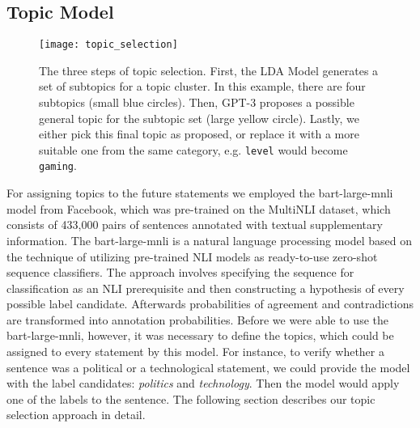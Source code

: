 \subsection{Topic Model}
\label{topic-model}
\begin{figure}[t]
    \centering
    \texttt{[image: topic\_selection]}
    \caption{
        The three steps of topic selection.
        First, the LDA Model generates a set of subtopics for a topic cluster.
        In this example, there are four subtopics (small blue circles).
        Then, GPT-3 proposes a possible general topic for the subtopic set (large yellow circle).
        Lastly, we either pick this final topic as proposed, or replace it with a more suitable one from the same category, e.g. \texttt{level} would become \texttt{gaming}.
    }
    \label{fig:topic_selection}
\end{figure}
For assigning topics to the future statements we employed the bart-large-mnli model from Facebook, which was pre-trained on the MultiNLI \citep{N18-1101} dataset, which consists of 433,000 pairs of sentences annotated with textual supplementary information. The bart-large-mnli is a natural language processing model based on the technique of \citet{yin2019benchmarking} utilizing pre-trained NLI models as ready-to-use zero-shot sequence classifiers.
The approach involves specifying the sequence for classification as an NLI prerequisite and then constructing a hypothesis of every possible label candidate.
Afterwards probabilities of agreement and contradictions are transformed into annotation probabilities.
Before we were able to use the bart-large-mnli, however, it was necessary to define the topics, which could be assigned to every statement by this model.
For instance, to verify whether a sentence was a political or a technological statement, we could provide the model with the label candidates: \emph{politics} and \emph{technology}. Then the model would apply one of the labels to the sentence.
The following section describes our topic selection approach in detail.

